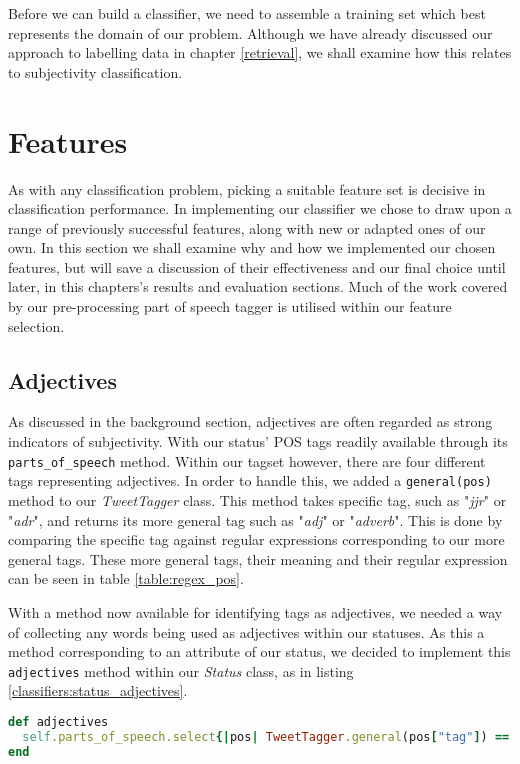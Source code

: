 Before we can build a classifier, we need to assemble a training set which best represents the domain of our problem. Although we have already discussed our approach to labelling data in chapter \ref{retrieval}, we shall examine how this relates to subjectivity classification.

\section{Features}

As with any classification problem, picking a suitable feature set is decisive in classification performance. In implementing our classifier we chose to draw upon a range of previously successful features, along with new or adapted ones of our own. In this section we shall examine why and how we implemented our chosen features, but will save a discussion of their effectiveness and our final choice until later, in this chapters's results and evaluation sections. Much of the work covered by our pre-processing part of speech tagger is utilised within our feature selection.

\subsection{Adjectives}

As discussed in the background section, adjectives are often regarded as strong indicators of subjectivity. With our status' POS tags readily available through its \texttt{parts\_of\_speech} method. Within our tagset however, there are four different tags representing adjectives. In order to handle this, we added a \texttt{general(pos)} method to our \emph{TweetTagger} class. This method takes specific tag, such as "\emph{jjr}" or "\emph{adr}", and returns its more general tag such as "\emph{adj}" or "\emph{adverb}". This is done by comparing the specific tag against regular expressions corresponding to our more general tags. These more general tags, their meaning and their regular expression can be seen in table \ref{table:regex_pos}.

With a method now available for identifying tags as adjectives, we needed a way of collecting any words being used as adjectives within our statuses. As this a method corresponding to an attribute of our status, we decided to implement this \texttt{adjectives} method within our \emph{Status} class, as in listing \ref{classifiers:status_adjectives}.

\begin{lstlisting}[language=Ruby, caption={\emph{Status} object method for returning all words being used as adjectives within the status}, label=classifiers:status_adjectives]
def adjectives
  self.parts_of_speech.select{|pos| TweetTagger.general(pos["tag"]) == "adj"}
end
\end{lstlisting}

